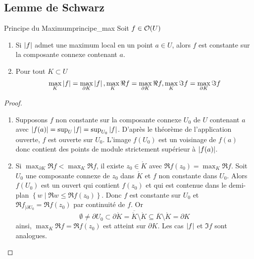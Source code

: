 \documentclass{cours}
\begin{document}
\subsection{Lemme de Schwarz}
\begin{théorème}{Principe du Maximum}{principe_max}
    Soit $f \in \mathcal{O}(U)$
    \begin{enumerate}
        \item Si $\left|f\right|$ admet une maximum local en un point $a \in U$, alors $f$ est constante sur la composante connexe contenant $a$. 
        \item Pour tout $K \subset U$
        \[
            \max_{K}\left|f\right| = \max_{\partial K}\left|f\right|, \max_{K}\Re f = \max_{\partial K}\Re f, \max_{K}\Im f = \max_{\partial K} \Im f
        \]
    \end{enumerate}
\end{théorème}
\begin{proof}
    \begin{enumerate}
        \item Supposons $f$ non constante sur la composante connexe $U_{0}$ de $U$ contenant $a$ avec $\left|f(a)\right| = \sup_{U}\left|f\right| = \sup_{U_{0}}\left|f\right|$. D'après le théorème de l'application ouverte, $f$ est ouverte sur $U_{0}$. L'image $f(U_{0})$ est un voisinage de $f(a)$ donc contient des points de module strictement supérieur à $\left|f(a)\right|$.
        \item Si $\max_{\partial K}\Re f < \max_{K}\Re f$, il existe $z_{0} \in \mathring{K}$ avec $\Re f(z_{0}) = \max_{K}\Re f$. Soit $U_{0}$ une composante connexe de $z_{0}$ dans $\mathring{K}$ et $f$ non constante dans $U_{0}$. Alors $f(U_{0})$ est un ouvert qui contient $f(z_{0})$ et qui est contenue dans le demi-plan $\left\{w\mid \Re w \leq \Re f(z_{0})\right\}$. Donc $f$ est constante sur $U_{0}$ et $\Re f_{\mid \partial U_{0}} = \Re f(z_{0})$ par continuité de $f$. Or
        \[
            \emptyset \neq \partial U_{0} \subset \partial \mathring{K} = \overline{\mathring{K}} \setminus \mathring{K} \subseteq \overline{K} \setminus \mathring{K} = \partial K
        \]
        ainsi, $\max_{K}\Re f = \Re f(z_{0})$ est atteint sur $\partial K$. Les cas $\left|f\right|$ et $\Im f$ sont analogues. 
    \end{enumerate}
\end{proof}
\end{document}
